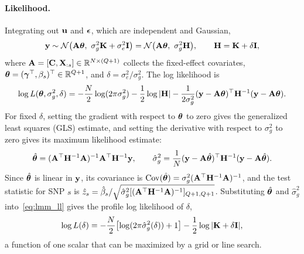 \paragraph{Likelihood.} Integrating out $\mathbf{u}$ and $\boldsymbol{\epsilon}$, which are independent and Gaussian,
\begin{equation}
  \vy\sim\Normal\bigl(\mA\vtheta,\ \sigma_g^2\mK+\sigma_e^2\mI\bigr) = \Normal\bigl(\mA\vtheta,\ \sigma_g^2\mH\bigr),\qquad \mH=\mK+\delta\mI,
\end{equation}
where $\mathbf{A}=[\mathbf{C},\mathbf{X}_{:s}]\in\mathbb{R}^{N\times(Q+1)}$ collects the fixed-effect covariates, $\boldsymbol{\theta}=(\boldsymbol{\gamma}^\top,\beta_s)^\top\in\mathbb{R}^{Q+1}$, and $\delta=\sigma_e^2/\sigma_g^2$. The log likelihood is
\begin{equation}
  \log L(\boldsymbol{\theta},\sigma_g^2,\delta) = -\frac N2\log(2\pi\sigma_g^2) - \frac12\log|\mathbf{H}| - \frac1{2\sigma_g^2}(\mathbf{y}-\mathbf{A}\boldsymbol{\theta})^\top\mathbf{H}^{-1}(\mathbf{y}-\mathbf{A}\boldsymbol{\theta}).
  \label{eq:lmm_ll}
\end{equation}
For fixed $\delta$, setting the gradient with respect to $\boldsymbol{\theta}$ to zero gives the generalized least squares (GLS) estimate, and setting the derivative with respect to $\sigma_g^2$ to zero gives its maximum likelihood estimate:
\begin{equation}
  \hat{\boldsymbol{\theta}} = (\mathbf{A}^\top\mathbf{H}^{-1}\mathbf{A})^{-1}\mathbf{A}^\top\mathbf{H}^{-1}\mathbf{y},\qquad
  \hat\sigma_g^2 = \frac1N(\mathbf{y}-\mathbf{A}\hat{\boldsymbol{\theta}})^\top\mathbf{H}^{-1}(\mathbf{y}-\mathbf{A}\hat{\boldsymbol{\theta}}).
\end{equation}
Since $\hat{\boldsymbol{\theta}}$ is linear in $\mathbf{y}$, its covariance is $\operatorname{Cov}(\hat{\boldsymbol{\theta}})=\sigma_g^2(\mathbf{A}^\top\mathbf{H}^{-1}\mathbf{A})^{-1}$, and the test statistic for SNP $s$ is $\hat z_s=\hat\beta_s/\sqrt{\hat\sigma_g^2[(\mathbf{A}^\top\mathbf{H}^{-1}\mathbf{A})^{-1}]_{Q+1,Q+1}}$. Substituting $\hat{\boldsymbol{\theta}}$ and $\hat\sigma_g^2$ into~\eqref{eq:lmm_ll} gives the profile log likelihood of $\delta$,
\begin{equation}
  \log L(\delta) = -\frac N2\bigl[\log(2\pi\hat\sigma_g^2(\delta))+1\bigr] - \frac12\log|\mathbf{K}+\delta\mathbf{I}|,
\end{equation}
a function of one scalar that can be maximized by a grid or line search.

